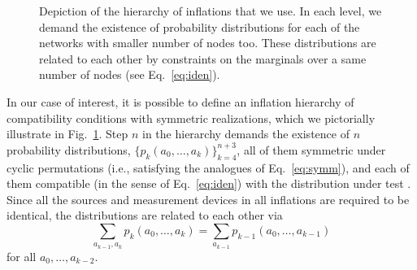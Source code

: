 \documentclass[aps,physrev,reprint,superscriptaddress,nofootinbib,twocolumn]{revtex4-2}
\begin{document}
\begin{figure}
    \centering
    \caption{
        Depiction of the hierarchy of inflations that we use.
        In each level, we demand the existence of probability distributions for each of the networks with smaller number of nodes too.
        These distributions are related to each other by constraints on the marginals over a same number of nodes (see Eq.~\eqref{eq:iden}).}
    \label{fig:hierarchy}
\end{figure}

In our case of interest, it is possible to define an inflation hierarchy of compatibility conditions with symmetric realizations, which we pictorially illustrate in Fig.~\ref{fig:hierarchy}.
Step $n$ in the hierarchy demands the existence of $n$ probability distributions, $\{p_k(a_0,\dots,a_k)\}_{k=4}^{n+3}$, all of them symmetric under cyclic permutations (i.e., satisfying the analogues of Eq.~\eqref{eq:symm}), and each of them compatible (in the sense of Eq.~\eqref{eq:iden}) with the distribution under test \cite{girardin2023}.
Since all the sources and measurement devices in all inflations are required to be identical, the distributions are related to each other via
\begin{equation}
    \sum_{a_{k-1},a_k}p_k(a_0,\dots,a_k) = \sum_{a_{k-1}}p_{k-1}(a_0,\dots,a_{k-1})
\end{equation}
for all $a_0,\dots,a_{k-2}$.
\end{document}
